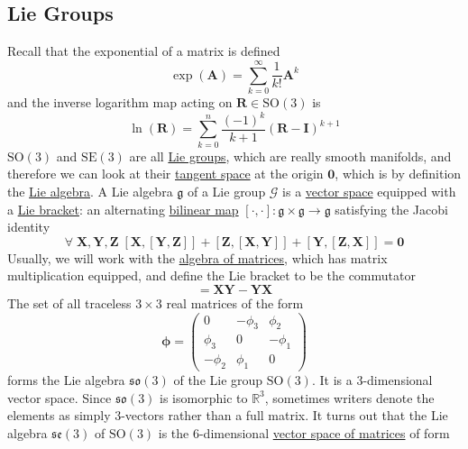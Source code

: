 \documentclass{article}
\newcounter{definition}[section]
\begin{document}
  \subsection{Lie Groups}

  Recall that the exponential of a matrix is defined 
  \begin{equation}
    \exp(\mathbf{A}) = \sum_{k=0}^\infty \frac{1}{k!} \mathbf{A}^k
  \end{equation}
  and the inverse logarithm map acting on $\mathbf{R} \in \mathrm{SO}(3)$ is 
  \begin{equation}
    \ln(\mathbf{R}) = \sum_{k=0}^n \frac{(-1)^k}{k + 1} (\mathbf{R} - \mathbf{I})^{k+1}
  \end{equation}
  $\mathrm{SO}(3)$ and $\mathrm{SE}(3)$ are all \hyperref[sm-def:lie-group]{Lie groups}, which are really smooth manifolds, and therefore we can look at their \hyperref[mv-def:tangent-space]{tangent space} at the origin $\mathbf{0}$, which is by definition the \hyperref[sm-def:lie-algebra]{Lie algebra}. A Lie algebra $\mathfrak{g}$ of a Lie group $\mathcal{G}$ is a \hyperref[lin-def:vector-space]{vector space} equipped with a \hyperref[sm-def:lie-bracket]{Lie bracket}: an alternating \hyperref[lin-def:bilinear-map]{bilinear map} $[ \cdot, \cdot] : \mathfrak{g} \times \mathfrak{g} \to \mathfrak{g}$ satisfying the Jacobi identity 
  \begin{equation}
    \forall \;  \mathbf{X}, \mathbf{Y}, \mathbf{Z} \; [\mathbf{X}, [\mathbf{Y}, \mathbf{Z}]] + [\mathbf{Z}, [\mathbf{X}, \mathbf{Y}]] + [\mathbf{Y}, [\mathbf{Z}, \mathbf{X}]] = \mathbf{0}
  \end{equation}
  Usually, we will work with the \hyperref[lin-thm:algebra-of-matrices]{algebra of matrices}, which has matrix multiplication equipped, and define the Lie bracket to be the commutator 
  \begin{equation}
    [\mathbf{X}, \mathbf{Y}] = \mathbf{X} \mathbf{Y} - \mathbf{Y} \mathbf{X}
  \end{equation}
  The set of all traceless $3 \times 3$ real matrices of the form
  \begin{equation}
    \boldsymbol{\phi} = \begin{pmatrix} 0 & - \phi_3 & \phi_2 \\ \phi_3 & 0 & -\phi_1 \\ - \phi_2 & \phi_1 & 0 \end{pmatrix}
  \end{equation}
  forms the Lie algebra $\mathfrak{so}(3)$ of the Lie group $\mathrm{SO}(3)$. It is a $3$-dimensional vector space. Since $\mathfrak{so}(3)$ is isomorphic to $\mathbb{R}^3$, sometimes writers denote the elements as simply $3$-vectors rather than a full matrix. It turns out that the Lie algebra $\mathfrak{se}(3)$ of $\mathrm{SO}(3)$ is the $6$-dimensional \hyperref[lin-thm:vector-space-of-matrices]{vector space of matrices} of form
\end{document}
